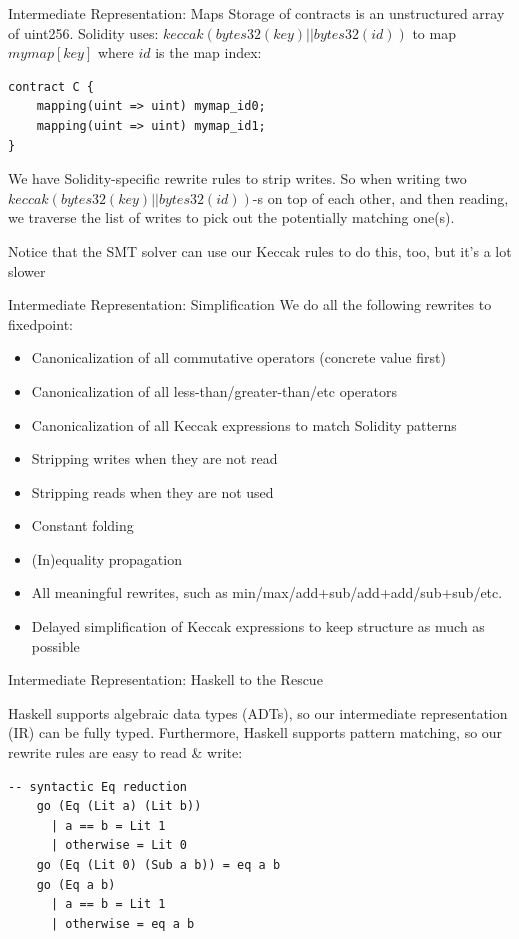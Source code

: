 \documentclass[aspectratio=169]{beamer}
\begin{document}
\begin{frame}[fragile=singleslide]{Intermediate Representation: Maps}
Storage of contracts is an unstructured array of uint256. Solidity uses: $keccak (bytes32(key) || bytes32(id))$ to map $mymap[key]$ where $id$ is the map index:

\begin{Verbatim}[frame=single, framerule=0.2mm, framesep=2mm,fontsize=\small]
contract C {
    mapping(uint => uint) mymap_id0;
    mapping(uint => uint) mymap_id1;
}
\end{Verbatim}
We have Solidity-specific rewrite rules to strip writes. So when writing two $keccak (bytes32(key) || bytes32(id))$-s on top of each other, and then reading, we traverse the list of writes to pick out the potentially matching one(s).
\bigskip

Notice that the SMT solver can use our Keccak rules to do this, too, but it's a lot slower
\end{frame}

\begin{frame}[fragile=singleslide]{Intermediate Representation: Simplification} 
We do all the following rewrites to fixedpoint:
\begin{itemize}
\item Canonicalization of all commutative operators (concrete value first)
\item Canonicalization of all less-than/greater-than/etc operators
\item Canonicalization of all Keccak expressions to match Solidity patterns
\item Stripping writes when they are not read
\item Stripping reads when they are not used
\item Constant folding
\item (In)equality propagation
\item All meaningful rewrites, such as min/max/add+sub/add+add/sub+sub/etc.
\item Delayed simplification of Keccak expressions to keep structure as much as possible
\end{itemize}
\end{frame}

\begin{frame}[fragile=singleslide]{Intermediate Representation: Haskell to the Rescue}

Haskell supports algebraic data types (ADTs), so our intermediate representation (IR) can be fully typed. Furthermore, Haskell supports pattern matching, so our rewrite rules are easy to read \& write:
\begin{Verbatim}[frame=single, framerule=0.2mm, framesep=2mm,fontsize=\small]
    -- syntactic Eq reduction
    go (Eq (Lit a) (Lit b))
      | a == b = Lit 1
      | otherwise = Lit 0
    go (Eq (Lit 0) (Sub a b)) = eq a b
    go (Eq a b)
      | a == b = Lit 1
      | otherwise = eq a b
\end{Verbatim}
\end{frame}
\end{document}
